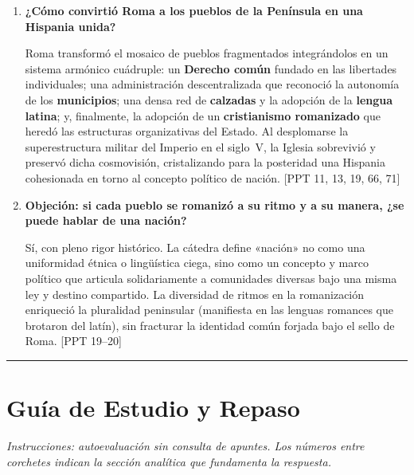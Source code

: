 \documentclass[11pt,letterpaper]{article}
\newcommand{\fuente}[1]{\nolinebreak\hfill{\footnotesize\color{black!55}\textsc{[#1]}}}
\newcommand{\preg}[1]{\item \textbf{#1}\par\nopagebreak\vspace{0.2em}}
\begin{document}
\begin{enumerate}[resume]
  \preg{¿Cómo convirtió Roma a los pueblos de la Península en una Hispania unida?}
  Roma transformó el mosaico de pueblos fragmentados integrándolos en un sistema armónico cuádruple: un \textbf{Derecho común} fundado en las libertades individuales; una administración descentralizada que reconoció la autonomía de los \textbf{municipios}; una densa red de \textbf{calzadas} y la adopción de la \textbf{lengua latina}; y, finalmente, la adopción de un \textbf{cristianismo romanizado} que heredó las estructuras organizativas del Estado. Al desplomarse la superestructura militar del Imperio en el siglo~V, la Iglesia sobrevivió y preservó dicha cosmovisión, cristalizando para la posteridad una Hispania cohesionada en torno al concepto político de nación. \fuente{PPT 11, 13, 19, 66, 71}

  \preg{Objeción: si cada pueblo se romanizó a su ritmo y a su manera, ¿se puede hablar de una nación?}
  Sí, con pleno rigor histórico. La cátedra define «nación» no como una uniformidad étnica o lingüística ciega, sino como un concepto y marco político que articula solidariamente a comunidades diversas bajo una misma ley y destino compartido. La diversidad de ritmos en la romanización enriqueció la pluralidad peninsular (manifiesta en las lenguas romances que brotaron del latín), sin fracturar la identidad común forjada bajo el sello de Roma. \fuente{PPT 19--20}
\end{enumerate}

\vspace{0.8em}
\noindent\rule{\linewidth}{0.4pt}
\vspace{0.8em}

\section*{Guía de Estudio y Repaso}

\noindent\textit{Instrucciones: autoevaluación sin consulta de apuntes. Los números entre corchetes indican la sección analítica que fundamenta la respuesta.}
\end{document}
